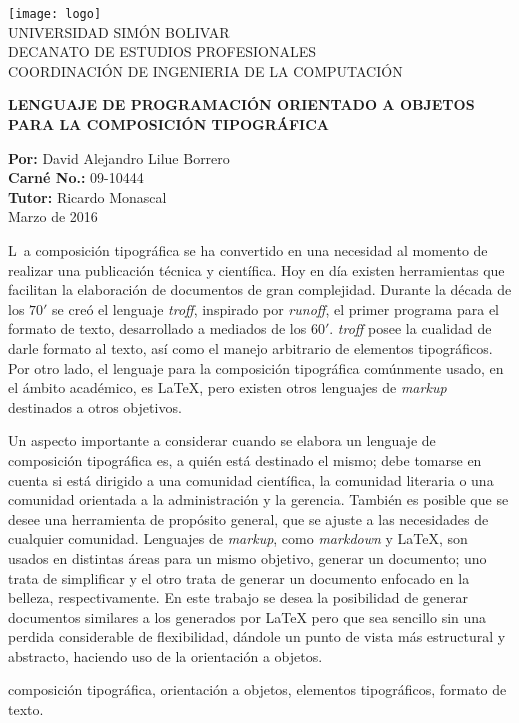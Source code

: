 \documentclass[12pt,letterpaper,titlepage,oneside,openright]{book}
\newcommand{\troff}{\textit{troff}\xspace}
\newcommand{\latex}{\LaTeX\xspace}
\begin{document}
\newpage

\cleardoublepage
{}
{}
{%
\begin{center}
        \texttt{[image: logo]}\\
        {\large UNIVERSIDAD SIMÓN BOLIVAR}\\
        DECANATO DE ESTUDIOS PROFESIONALES\\
        COORDINACIÓN DE INGENIERIA DE LA COMPUTACIÓN
        
        \textbf{LENGUAJE DE PROGRAMACIÓN ORIENTADO A OBJETOS PARA LA COMPOSICIÓN TIPOGRÁFICA}
\end{center}

\begin{flushright}
{\bf Por:} David Alejandro  Lilue Borrero\\
{\bf Carné No.:} 09-10444\\
{\bf Tutor:} Ricardo Monascal\\
Marzo de 2016
\end{flushright}

\lettrine[lines=2]{L}{}\ a composición tipográfica se ha convertido en una necesidad
al momento de realizar una publicación técnica y científica. Hoy en día existen
herramientas que facilitan la elaboración de documentos de gran complejidad. Durante
la década de los $70'$ se creó el lenguaje \troff, inspirado por \textit{runoff}, el
primer programa para el formato de texto, desarrollado a mediados de los $60'$.
\troff posee la cualidad de darle formato al texto, así como el manejo arbitrario de
elementos tipográficos. Por otro lado, el lenguaje para la composición tipográfica
comúnmente usado, en el ámbito académico, es \latex, pero existen otros lenguajes de
\textit{markup} destinados a otros objetivos.

Un aspecto importante a considerar cuando se elabora un lenguaje de composición
tipográfica es, a quién está destinado el mismo; debe tomarse en cuenta si está
dirigido a una comunidad científica, la comunidad literaria o una comunidad orientada
a la administración y la gerencia. También es posible que se desee una herramienta de
propósito general, que se ajuste a las necesidades de cualquier comunidad. Lenguajes
de \textit{markup}, como \textit{markdown} y \LaTeX, son usados en distintas áreas
para un mismo objetivo, generar un documento; uno trata de simplificar y el otro
trata de generar un documento enfocado en la belleza, respectivamente. En este trabajo se desea la posibilidad de generar documentos similares a los generados por \latex pero que sea sencillo sin una perdida considerable de flexibilidad, dándole un punto de vista más estructural y abstracto, haciendo uso de la orientación a objetos. %

 composición tipográfica, orientación a objetos, elementos tipográficos, formato de texto. 
}
\end{document}
